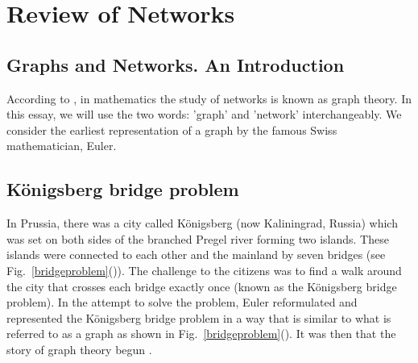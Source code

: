 \documentclass[10pt,a4paper]{article}
\theoremstyle{plain}
\theoremstyle{definition}
\begin{document}
	\newpage
	\section{Review of Networks}
	
\subsection{Graphs and Networks. An Introduction}

According to \cite{estrada2011structure}, in mathematics the study of networks is known as graph theory. In this essay, we will use the two words: 'graph' and 'network' interchangeably. We consider the earliest representation of a graph by the famous Swiss mathematician, Euler.

\subsection{K\"{o}nigsberg bridge problem}
In Prussia, there was a city called  K\"{o}nigsberg (now Kaliningrad, Russia) which was set on both sides of the branched Pregel river forming two islands. These islands were connected to each other and the mainland by seven bridges (see Fig.~\ref{bridgeproblem}()). The challenge to the citizens was to find a walk around the city that crosses each bridge exactly once (known as the K\"{o}nigsberg bridge problem). In the attempt to solve the problem, Euler reformulated and represented the K\"{o}nigsberg bridge problem in a way that is similar to what is referred to as a graph as shown in Fig.~\ref{bridgeproblem}(). It was then that the story of graph theory begun \citep{estrada2011structure}.
\end{document}
